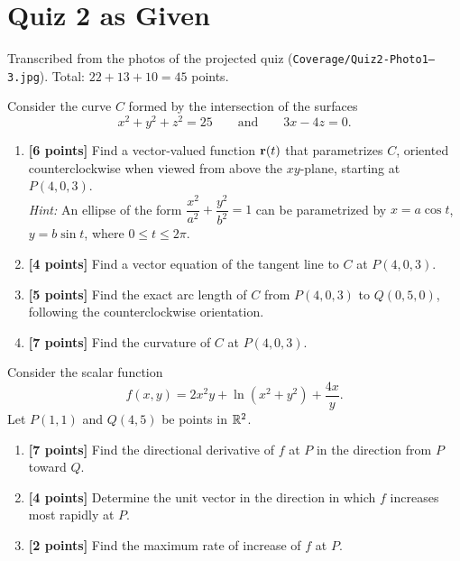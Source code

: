 \section{Quiz 2 as Given}\label{ch:quiz}

Transcribed from the photos of the projected quiz (\texttt{Coverage/Quiz2-Photo1--3.jpg}).
Total: $22+13+10=45$ points.

\begin{questions}
\item Consider the curve $C$ formed by the intersection of the surfaces
      \[ x^2+y^2+z^2=25\qquad\text{and}\qquad 3x-4z=0. \]
      \begin{enumerate}[label=(\alph*)]
        \item \textbf{[6 points]} Find a vector-valued function $\mathbf{r}(t)$ that
              parametrizes $C$, oriented counterclockwise when viewed from above
              the $xy$-plane, starting at $P(4,0,3)$.\\
              \emph{Hint:} An ellipse of the form $\dfrac{x^2}{a^2}+\dfrac{y^2}{b^2}=1$
              can be parametrized by $x=a\cos t$, $y=b\sin t$, where $0\le t\le2\pi$.
        \item \textbf{[4 points]} Find a vector equation of the tangent line to $C$ at $P(4,0,3)$.
        \item \textbf{[5 points]} Find the exact arc length of $C$ from $P(4,0,3)$ to
              $Q(0,5,0)$, following the counterclockwise orientation.
        \item \textbf{[7 points]} Find the curvature of $C$ at $P(4,0,3)$.
      \end{enumerate}
\item Consider the scalar function
      \[ f(x,y)=2x^2y+\ln(x^2+y^2)+\frac{4x}{y}. \]
      Let $P(1,1)$ and $Q(4,5)$ be points in $\mathbb{R}^2$.
      \begin{enumerate}[label=(\alph*)]
        \item \textbf{[7 points]} Find the directional derivative of $f$ at $P$ in the direction from $P$ toward $Q$.
        \item \textbf{[4 points]} Determine the unit vector in the direction in which $f$ increases most rapidly at $P$.
        \item \textbf{[2 points]} Find the maximum rate of increase of $f$ at $P$.
      \end{enumerate}
\end{questions}

